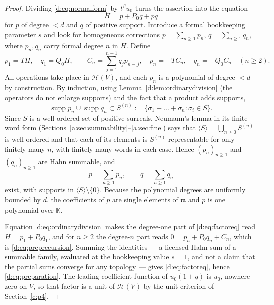 \documentclass[11pt,a4paper]{article}
\numberwithin{equation}{section}
\theoremstyle{definition}
\theoremstyle{remark}
\theoremstyle{plain}
\newcommand{\K}{\mathbb K}
\newcommand{\mm}{\mathfrak m}
\DeclareMathOperator{\supp}{supp}
\newcommand{\tm}{t}
\newcommand{\Hc}{\mathcal H}
\newcommand{\Neu}[1]{\langle #1\rangle}
\begin{document}
\begin{proof}
Dividing \eqref{d:eq:normalform} by $\tm^{\beta}u_0$ turns the assertion
into the equation
\begin{equation}\label{d:eq:factoreq}
 H=p+P_0q+pq
\end{equation}
for $p$ of degree $<d$ and $q$ of positive support.  Introduce a formal
bookkeeping parameter $s$ and look for homogeneous corrections
$p=\sum_{n\ge1}p_n$, $q=\sum_{n\ge1}q_n$, where $p_n,q_n$ carry formal
degree $n$ in $H$.  Define
\begin{equation}\label{d:eq:preprecursion}
 p_1=T H,\quad q_1=Q_0H,
 \qquad
 C_n=\sum_{j=1}^{n-1}q_jp_{n-j},\quad
 p_n=-T C_n,\quad q_n=-Q_0C_n\quad(n\ge2).
\end{equation}
All operations take place in $\Hc(V)$, and each $p_n$ is a polynomial
of degree $<d$ by construction.  By induction, using
Lemma~\ref{d:lem:ordinarydivision} (the operators do not enlarge
supports) and the fact that a product adds supports,
\[
 \supp p_n\cup\supp q_n\subset S^{(n)}
 :=\{\sigma_1+\dots+\sigma_n:\sigma_i\in S\}.
\]
Since $S$ is a well-ordered set of positive surreals, Neumann's lemma
in its finite-word form (Sections~\ref{a:sec:summability}--\ref{a:sec:fine}) says that
$\Neu{S}=\bigcup_{n\ge0}S^{(n)}$ is well ordered and that each of its
elements is $S^{(n)}$-representable for only finitely many $n$, with
finitely many words in each case.  Hence $(p_n)_{n\ge1}$ and
$(q_n)_{n\ge1}$ are Hahn summable, and
\[
 p=\sum_{n\ge1}p_n,\qquad q=\sum_{n\ge1}q_n
\]
exist, with supports in $\Neu{S}\setminus\{0\}$.  Because the
polynomial degrees are uniformly bounded by $d$, the coefficients of
$p$ are single elements of $\mm$ and $p$ is one polynomial over $\K$.

Equation \eqref{d:eq:ordinarydivision} makes the degree-one part of
\eqref{d:eq:factoreq} read $H=p_1+P_0q_1$, and for $n\ge2$ the
degree-$n$ part reads $0=p_n+P_0q_n+C_n$, which is
\eqref{d:eq:preprecursion}.  Summing the identities --- a licensed Hahn
sum of a summable family, evaluated at the bookkeeping value $s=1$, and
not a claim that the partial sums converge for any topology --- gives
\eqref{d:eq:factoreq}, hence \eqref{d:eq:preparation}.  The leading
coefficient function of $u_0(1+q)$ is $u_0$, nowhere zero on $V$, so
that factor is a unit of $\Hc(V)$ by the unit criterion of Section~\ref{c:p4}.


\end{proof}
\end{document}
